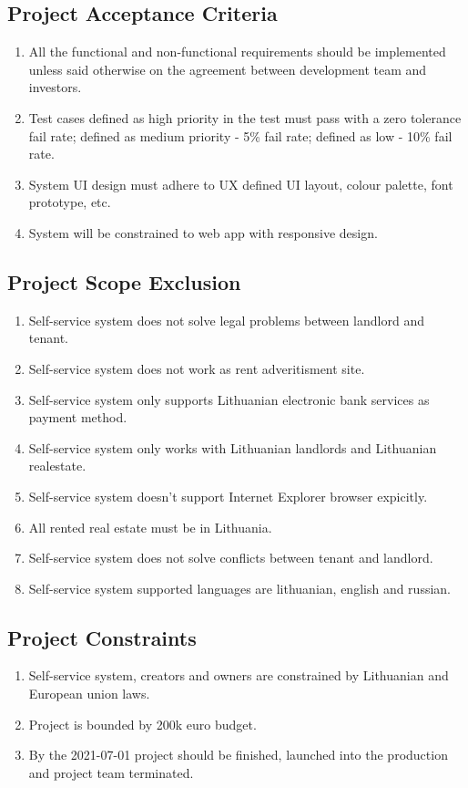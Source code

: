 \documentclass{VUMIFPSkursinis}
\begin{document}
	\subsection{Project Acceptance Criteria}
		\begin{enumerate}
			\item{All the functional and non-functional requirements should be implemented unless said otherwise on the agreement between development team and investors.}
			\item{Test cases defined as high priority in the test must pass with a zero tolerance fail rate; defined as medium priority - 5\% fail rate; defined as low - 10\% fail rate.}
			\item{System UI design must adhere to UX defined UI layout, colour palette, font prototype, etc.}
			\item{System will be constrained to web app with responsive design.}
		\end{enumerate}


	\subsection{Project Scope Exclusion}
		\begin{enumerate}
			\item{Self-service system does not solve legal problems between landlord and tenant.}
			\item{Self-service system does not work as rent adveritisment site.}
			\item{Self-service system only supports Lithuanian electronic bank services as payment method.}
			\item{Self-service system only works with Lithuanian landlords and Lithuanian realestate.}
			\item{Self-service system doesn't support Internet Explorer browser expicitly.}
			\item{All rented real estate must be in Lithuania.}
			\item{Self-service system does not solve conflicts between tenant and landlord.}
			\item{Self-service system supported languages are lithuanian, english and russian.}
		\end{enumerate}

	\subsection{Project Constraints}
		\begin{enumerate}
			\item{Self-service system, creators and owners are constrained by Lithuanian and European union laws.}
			\item{Project is bounded by 200k euro budget.}
			\item{By the 2021-07-01 project should be finished, launched into the production and project team terminated.}
		\end{enumerate}
\end{document}
